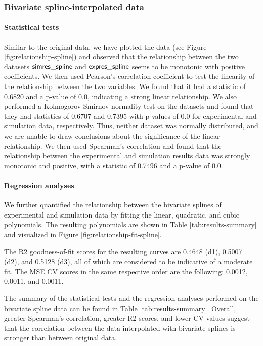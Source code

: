 \subsubsection{Bivariate spline-interpolated data}

\paragraph{Statistical tests}

Similar to the original data, we have plotted the data (see Figure \ref{fig:relationship-spline}) and observed that the relationship between the two datasets $\mathsf{simres\_spline}$ and $\mathsf{expres\_spline}$ seems to be monotonic with positive coefficients. We then used Pearson's correlation coefficient to test the linearity of the relationship between the two variables. We found that it had a statistic of 0.6820 and a p-value of 0.0, indicating a strong linear relationship. We also performed a Kolmogorov-Smirnov normality test on the datasets and found that they had statistics of 0.6707 and 0.7395 with p-values of 0.0 for experimental and simulation data, respectively. Thus, neither dataset was normally distributed, and we are unable to draw conclusions about the significance of the linear relationship.
We then used Spearman's correlation and found that the relationship between the experimental and simulation results data was strongly monotonic and positive, with a statistic of 0.7496 and a p-value of 0.0. 

\paragraph{Regression analyses}

We further quantified the relationship between the bivariate splines of experimental and simulation data by fitting the linear, quadratic, and cubic polynomials. The resulting polynomials are shown in Table \ref{tab:results-summary} and visualized in Figure \ref{fig:relationship-fit-spline}.

The R2 goodness-of-fit scores for the resulting curves are 0.4648 (d1), 0.5007 (d2), and 0.5128 (d3), all of which are considered to be indicative of a moderate fit. The MSE CV scores in the same respective order are the following: 0.0012, 0.0011, and 0.0011. 

The summary of the statistical tests and the regression analyses performed on the bivariate spline data can be found in Table \ref{tab:results-summary}. Overall, greater Spearman's correlation, greater R2 scores, and lower CV values suggest that the correlation between the data interpolated with bivariate splines is stronger than between original data.
